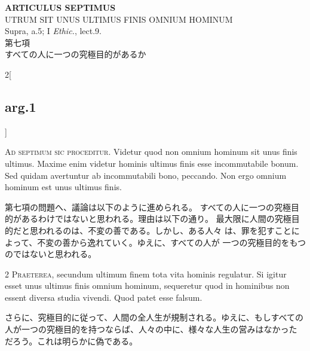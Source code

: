 \documentclass[paper=a4paper,fontsize=10pt,jafontsize=9pt,titlepage]{jlreq}
\begin{document}
{}
\setcounter{section}{7}
\setcounter{subsection}{0}
\begin{center}
 {\Large {\bfseries ARTICULUS SEPTIMUS}}\\
 {\large UTRUM SIT UNUS ULTIMUS FINIS OMNIUM HOMINUM}\\
 {\footnotesize Supra, a.5; I {\itshape Ethic.}, lect.9.}\\
 {\Large 第七項\\すべての人に一つの究極目的があるか}
\end{center}

\begin{paracol}{2}[\subsection{arg.1}]

{\Huge A}{\scshape d septimum sic proceditur}. Videtur
quod non omnium hominum sit unus finis ultimus. Maxime enim videtur
hominis ultimus finis esse incommutabile bonum. Sed quidam avertuntur ab
incommutabili bono, peccando. Non ergo omnium hominum est unus ultimus
finis.

\switchcolumn

第七項の問題へ、議論は以下のように進められる。
すべての人に一つの究極目的があるわけではないと思われる。理由は以下の通り。
最大限に人間の究極目的だと思われるのは、不変の善である。しかし、ある人々
 は、罪を犯すことによって、不変の善から逸れていく。ゆえに、すべての人が
 一つの究極目的をもつのではないと思われる。


{\scshape 2 Praeterea}, secundum ultimum finem tota
vita hominis regulatur. Si igitur esset unus ultimus finis omnium
hominum, sequeretur quod in hominibus non essent diversa studia
vivendi. Quod patet esse falsum.

\switchcolumn

さらに、究極目的に従って、人間の全人生が規制される。ゆえに、もしすべての
 人が一つの究極目的を持つならば、人々の中に、様々な人生の営みはなかった
 だろう。これは明らかに偽である。



\end{paracol}
\end{document}
